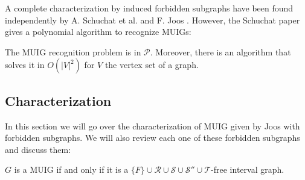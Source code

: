  A complete characterization by induced forbidden subgraphs have been found independently by A. Schuchat et al. \cite{shuchatUnitMixedInterval2014a} and F. Joos \cite{joosCharacterizationMixedUnit2013}. However, the Schuchat paper gives a polynomial algorithm to recognize MUIGs:

\begin{theorem}
  The MUIG recognition problem is in $\mathcal{P}$. Moreover, there is an algorithm that solves it in $O(|V|^2)$ for $V$ the vertex set of a graph.
\end{theorem}

\subsection{Characterization}
\label{sec:muig_char}

In this section we will go over the characterization of MUIG given by Joos with forbidden subgraphs. We will also review each one of these forbidden subgraphs and discuss them:

\begin{theorem}
  $G$ is a MUIG if and only if it is a $\{F\}\cup\mathcal{R}\cup\mathcal{S}\cup\mathcal{S''}\cup\mathcal{T}$-free interval graph.
\end{theorem}


